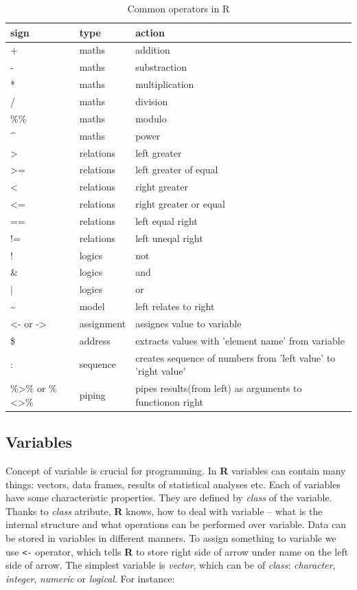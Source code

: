 \documentclass[]{book}
\theoremstyle{definition}
\theoremstyle{definition}
\theoremstyle{definition}
\theoremstyle{remark}
\begin{document}
\begin{longtable}[t]{lll}
\caption{\label{tab:tab-operators}Common operators in R}\\
\toprule
sign & type & action\\
\midrule
+ & maths & addition\\
- & maths & substraction\\
* & maths & multiplication\\
/ & maths & division\\
\%\% & maths & modulo\\
\addlinespace
\textasciicircum{} & maths & power\\
> & relations & left greater\\
>= & relations & left greater of equal\\
< & relations & right greater\\
<= & relations & right greater or equal\\
\addlinespace
== & relations & left equal right\\
!= & relations & left uneqal right\\
! & logics & not\\
\& & logics & and\\
| & logics & or\\
\addlinespace
\textasciitilde{} & model & left relates to right\\
<- or -> & assignment & assignes value to variable\\
\$ & address & extracts values with 'element name' from variable\\
: & sequence & creates sequence of numbers from 'left value' to 'right value'\\
\%>\% or \%<>\% & piping & pipes results(from left) as arguments to functionon right\\
\bottomrule
\end{longtable}

\subsection{Variables}\label{variables}

Concept of variable is crucial for programming. In \textbf{R} variables
can contain many things: vectors, data frames, results of statistical
analyses etc. Each of variables have some characteristic properties.
They are defined by \emph{class} of the variable. Thanks to \emph{class}
atribute, \textbf{R} knows, how to deal with variable -- what is the
internal structure and what operations can be performed over variable.
Data can be stored in variables in different manners. To assign
something to variable we use \texttt{\textless{}-} operator, which tells
\textbf{R} to store right side of arrow under name on the left side of
arrow. The simplest variable is \emph{vector}, which can be of
\emph{class}: \emph{character}, \emph{integer}, \emph{numeric} or
\emph{logical}. For instance:
\end{document}

